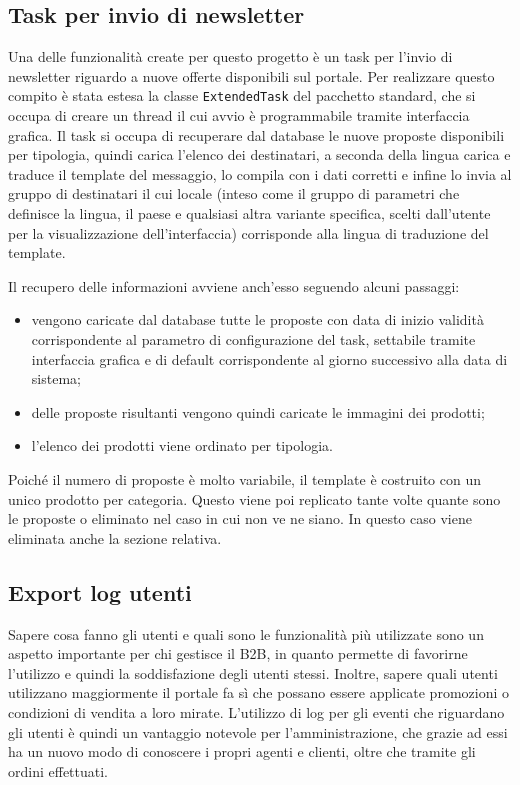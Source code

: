 \subsection{Task per invio di newsletter}
Una delle funzionalità create per questo progetto è un task per l'invio di newsletter riguardo a nuove offerte disponibili sul portale. Per realizzare questo compito è stata estesa la classe \texttt{ExtendedTask} del pacchetto standard, che si occupa di creare un thread il cui avvio è programmabile tramite interfaccia grafica. Il task si occupa di recuperare dal database le nuove proposte disponibili per tipologia, quindi carica l'elenco dei destinatari, a seconda della lingua carica e traduce il template del messaggio, lo compila con i dati corretti e infine lo invia al gruppo di destinatari il cui locale (inteso come il gruppo di parametri che definisce la lingua, il paese e qualsiasi altra variante specifica, scelti dall'utente per la visualizzazione dell'interfaccia) corrisponde alla lingua di traduzione del template.

Il recupero delle informazioni avviene anch'esso seguendo alcuni passaggi:
\begin{itemize}
	\item vengono caricate dal database tutte le proposte con data di inizio validità corrispondente al parametro di configurazione del task, settabile tramite interfaccia grafica e di default corrispondente al giorno successivo alla data di sistema;
	\item delle proposte risultanti vengono quindi caricate le immagini dei prodotti;
	\item l'elenco dei prodotti viene ordinato per tipologia.
\end{itemize}
Poiché il numero di proposte è molto variabile, il template è costruito con un unico prodotto per categoria. Questo viene poi replicato tante volte quante sono le proposte o eliminato nel caso in cui non ve ne siano. In questo caso viene eliminata anche la sezione relativa.


\subsection{Export log utenti}
Sapere cosa fanno gli utenti e quali sono le funzionalità più utilizzate sono un aspetto importante per chi gestisce il B2B, in quanto permette di favorirne l'utilizzo e quindi la soddisfazione degli utenti stessi. Inoltre, sapere quali utenti utilizzano maggiormente il portale fa sì che possano essere applicate promozioni o condizioni di vendita a loro mirate. L'utilizzo di log per gli eventi che riguardano gli utenti è quindi un vantaggio notevole per l'amministrazione, che grazie ad essi ha un nuovo modo di conoscere i propri agenti e clienti, oltre che tramite gli ordini effettuati.

